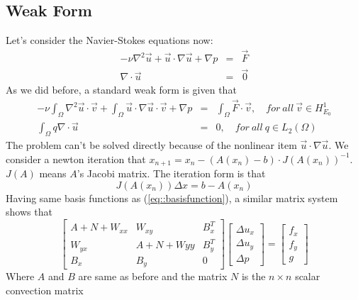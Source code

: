 \documentclass[a4paper]{article}
\begin{document}
\subsection{Weak Form}
Let's consider the Navier-Stokes equations now:
\begin{equation}
\begin{array}{rcl}
-\nu \nabla^2 \vec{u} + \vec{u}\cdot \nabla \vec{u} + \nabla p &=& \vec{F} \\
\nabla \cdot \vec{u} &=& \vec{0}
\label{eq::Navier-Stokes-problem}
\end{array}
\end{equation}
As we did before, a standard weak form is given that
\begin{equation}
\begin{array}{rcl}
-\nu\int_\Omega \nabla^2 \vec{u} \cdot \vec{v}+\int_{\Omega}\vec{u}\cdot\nabla\vec{u}\cdot\vec{v} + \nabla p &=& \int_{\Omega}\vec{F}\cdot \vec{v},\quad for \ all \ \vec{v} \in H^1_{E_0} \\
\int_\Omega q\nabla \cdot \vec{u} &=&0,\quad for \ all \ q \in L_2(\Omega)
\label{eq::Navier-Stokes-weakform}
\end{array}
\end{equation}
The problem can't be solved directly because of the nonlinear item $\vec{u}\cdot \nabla \vec{u}$. We consider a newton iteration that $x_{n+1}=x_{n} - (A(x_n)-b)\cdot J(A(x_{n}))^{-1}$. $J(A)$ means $A$'s Jacobi matrix. The iteration form is that
$$ J(A(x_n))\Delta x = b - A(x_n)$$
\indent Having same basis functions as (\ref{eq::basisfunction}), a similar matrix system shows that
\begin{equation}
\left[ \begin{array}{ccc}
A + N +W_{xx} & W_{xy} & B_x^T \\
W_{yx} & A +N +W{yy}& B_y^T \\
B_x & B_y & 0
\end{array}
\right]
\left[\begin{array}{ccc}
\Delta u_x\\
\Delta u_y\\
\Delta p
\end{array}
\right]=
\left[\begin{array}{ccc}
f_x\\
f_y\\
g
\end{array}
\right]
\label{Navier-Stokes}
\end{equation}
Where $A$ and $B$ are same as before and the matrix $N$ is the $n\times n$ scalar convection matrix
\end{document}
